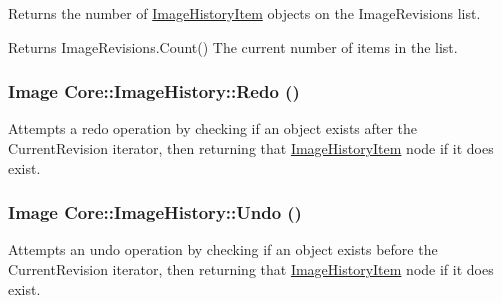 \label{class_core_1_1_image_history_ae26bcfeed34a733dd372896a86bbc3d4}
Returns the number of \hyperlink{class_core_1_1_image_history_item}{ImageHistoryItem} objects on the ImageRevisions list. \begin{DoxyReturn}{Returns}
ImageRevisions.Count() The current number of items in the list. 
\end{DoxyReturn}
\hypertarget{class_core_1_1_image_history_afc601ae64181e745d9d94f4b16633a90}{
\subsubsection[{Redo}]{\setlength{\rightskip}{0pt plus 5cm}Image Core::ImageHistory::Redo ()}}
\label{class_core_1_1_image_history_afc601ae64181e745d9d94f4b16633a90}
Attempts a redo operation by checking if an object exists after the CurrentRevision iterator, then returning that \hyperlink{class_core_1_1_image_history_item}{ImageHistoryItem} node if it does exist. \hypertarget{class_core_1_1_image_history_ade2a92df5f5525b0e3951b45b2f3434e}{
\subsubsection[{Undo}]{\setlength{\rightskip}{0pt plus 5cm}Image Core::ImageHistory::Undo ()}}
\label{class_core_1_1_image_history_ade2a92df5f5525b0e3951b45b2f3434e}
Attempts an undo operation by checking if an object exists before the CurrentRevision iterator, then returning that \hyperlink{class_core_1_1_image_history_item}{ImageHistoryItem} node if it does exist. 

